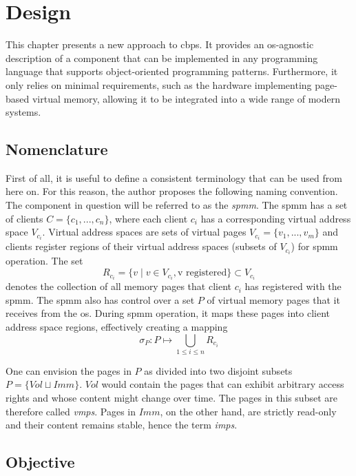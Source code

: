 \chapter{Design}
\label{chap:design}

This chapter presents a new approach to \ac{cbps}.
It provides an \ac{os}-agnostic description of a component that can be implemented in any programming language that supports object-oriented programming patterns.
Furthermore, it only relies on minimal requirements, such as the hardware implementing page-based virtual memory, allowing it to be integrated into a wide range of modern systems.

\section{Nomenclature}
\label{sec:nomenclature}

First of all, it is useful to define a consistent terminology that can be used from here on.
For this reason, the author proposes the following naming convention.
The component in question will be referred to as the \textit{\acf{spmm}}.
The \ac{spmm} has a set of clients $C = \{c_1,...,c_n\}$, where each client $c_i$ has a corresponding virtual address space $V_{c_i}$.
Virtual address spaces are sets of virtual pages $V_{c_i} = \{v_1,...,v_m\}$ and clients register regions of their virtual address spaces (subsets of $V_{c_i}$) for \ac{spmm} operation.
The set $$R_{c_i} = \{ v \mid v \in V_{c_i}, \text{v registered}\} \subset V_{c_i}$$ denotes the collection of all memory pages that client $c_i$ has registered with the \ac{spmm}.
The \ac{spmm} also has control over a set $P$ of virtual memory pages that it receives from the \ac{os}.
During \ac{spmm} operation, it maps these pages into client address space regions, effectively creating a mapping $$\sigma_{P}: P \mapsto \bigcup_{1 \leq i \leq n} R_{c_i}$$

One can envision the pages in $P$ as divided into two disjoint subsets $P = \{Vol \sqcup Imm\}$.
$Vol$ would contain the pages that can exhibit arbitrary access rights and whose content might change over time.
The pages in this subset are therefore called \textit{\acfp{vmp}}.
Pages in $Imm$, on the other hand, are strictly read-only and their content remains stable, hence the term \textit{\acfp{imp}}.

\section{Objective}
\label{sec:objective}

